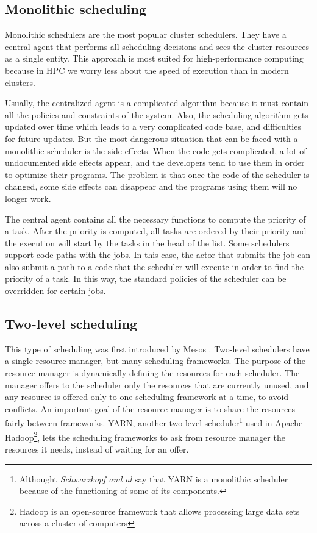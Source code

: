 \documentclass[11pt]{article}
\begin{document}
	\subsection{Monolithic scheduling}
    
        Monolithic schedulers are the most popular cluster schedulers. They have a central agent that performs all scheduling decisions and sees the cluster resources as a single entity. This approach is most suited for high-performance computing because in HPC we worry less about the speed of execution than in modern clusters. 
        
        Usually, the centralized agent is a complicated algorithm because it must contain all the policies and constraints of the system. Also, the scheduling algorithm gets updated over time which leads to a very complicated code base, and difficulties for future updates. But the most dangerous situation that can be faced with a monolithic scheduler is the side effects. When the code gets complicated, a lot of undocumented side effects appear, and the developers tend to use them in order to optimize their programs. The problem is that once the code of the scheduler is changed, some side effects can disappear and the programs using them will no longer work.
        
        The central agent contains all the necessary functions to compute the priority of a task. After the priority is computed, all tasks are ordered by their priority and the execution will start by the tasks in the head of the list. Some schedulers support code paths with the jobs. In this case, the actor that submits the job can also submit a path to a code that the scheduler will execute in order to find the priority of a task. In this way, the standard policies of the scheduler can be overridden for certain jobs.
        
       
	\subsection{Two-level scheduling}
    
    	This type of scheduling was first introduced by Mesos \cite{mesos}. Two-level schedulers have a single resource manager, but many scheduling frameworks. The purpose of the resource manager is dynamically defining the resources for each scheduler. The manager offers to the scheduler only the resources that are currently unused, and any resource is offered only to one scheduling framework at a time, to avoid conflicts. An important goal of the resource manager is to share the resources fairly between frameworks. YARN, another two-level scheduler\footnote{Althought \textit{Schwarzkopf and al} \cite{omega} say that YARN is a monolithic scheduler because of the functioning of some of its components.} used in Apache Hadoop\footnote{Hadoop is an open-source framework that allows processing large data sets across a cluster of computers}, lets the scheduling frameworks to ask from resource manager the resources it needs, instead of waiting for an offer.
        
\end{document}
